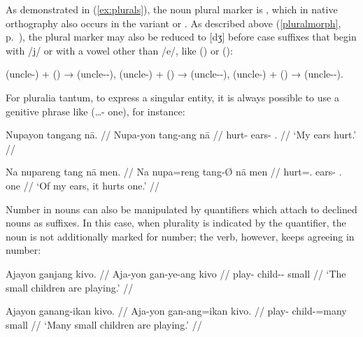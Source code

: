 As demonstrated in (\ref{ex:plurals}), the noun plural marker is 
, which in native orthography also occurs in the variant 
 or . As described above (\autoref{pluralmorph}, 
p.~\pageref{pluralmorph}), the plural marker may also be reduced to [dʒ] 
 before case suffixes that begin with /j/ or with a vowel other than 
/e/, like  (\Aarg{}) or  (\Dat{}):

\pex
	\a {} (uncle-\Aarg{})
		+  (\Pl{}) %
		→  (uncle-\Pl{}-\Aarg{}),
	\a {} (uncle-\Gen{})
		+  (\Pl{}) %
		→  (uncle-\Pl{}-\Gen{}),
	\a {} (uncle-\Dat{})
		+  (\Pl{}) %
		→  (uncle-\Pl{}-\Dat{}).
\xe

For pluralia tantum, to express a singular entity, it is always possible to 
use a genitive phrase like  (…-\Gen{} 
one), for instance:

\pex
\a\begingl
	\gla Nupayon tangang nā. //
	\glb Nupa-yon tang-ang nā //
	\glc hurt-\TplN{} ears-\Aarg{} \Fsg{}.\Gen{} //
	\glft `My ears hurt.' //
\endgl

\a\label{ex:gensubj}\begingl
	\gla Na nupareng tang nā men. //
	\glb Na nupa=reng tang-Ø nā men //
	\glc \GenT{} hurt=\TsgI{}.\Aarg{} ears-\Top{} \Fsg{}.\Gen{} one //
	\glft `Of my ears, it hurts one.' //
\endgl
\xe

Number in nouns can also be manipulated by quantifiers which attach to declined 
nouns as suffixes. In this case, when plurality is indicated by the 
quantifier, the noun is not additionally marked for number; the verb, however, 
keeps agreeing in number:

\pex
\a\begingl
	\gla Ajayon ganjang kivo. //
	\glb Aja-yon gan-ye-ang kivo //
	\glc play-\TsgN{} child-\Pl{}-\Aarg{} small //
	\glft `The small children are playing.' //
\endgl
	
\a\begingl
	\gla Ajayon ganang-ikan kivo. //
	\glb Aja-yon gan-ang=ikan kivo. //
	\glc play-\TsgN{} child-\Aarg{}=many small //
	\glft `Many small children are playing.' //
\endgl

